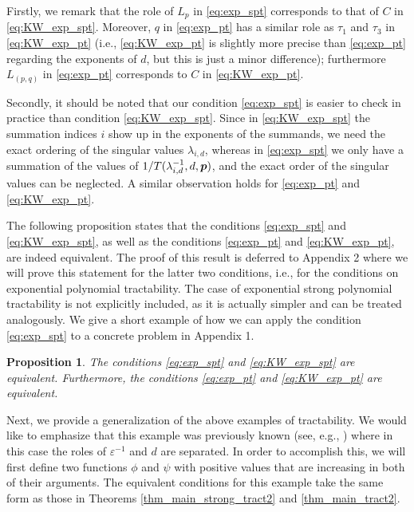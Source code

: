 \documentclass[sort&compress]{elsarticle}
\newcommand{\review}[1]{\begingroup\color{blue}#1\endgroup}
\newtheorem{proposition}{Proposition}
\begin{document}
Firstly, we remark that the role of $L_p$ in  \eqref{eq:exp_spt} corresponds to that of $C$ in \eqref{eq:KW_exp_spt}.
Moreover, $q$ in \eqref{eq:exp_pt} has a similar role as $\tau_1$ and $\tau_3$ in \eqref{eq:KW_exp_pt} (i.e., \eqref{eq:KW_exp_pt} is slightly more precise than \eqref{eq:exp_pt} regarding the exponents of $d$, but this is just a minor difference); furthermore $L_{(p,q)}$ in \eqref{eq:exp_pt} corresponds to $C$ in \eqref{eq:KW_exp_pt}.

Secondly, it should be noted that our condition \eqref{eq:exp_spt} is easier to check in practice than condition \eqref{eq:KW_exp_spt}. Since in \eqref{eq:KW_exp_spt} the summation indices $i$ show up in the exponents of the summands, we need the exact ordering of the singular values $\lambda_{i,d}$, whereas in \eqref{eq:exp_spt} we only have a summation of the values of $1/T(\lambda_{i,d}^{-1},d,\boldsymbol{p})$, and the exact order of the singular values can be neglected. A similar
observation holds for \eqref{eq:exp_pt} and \eqref{eq:KW_exp_pt}.

The following proposition states that the conditions \eqref{eq:exp_spt} and \eqref{eq:KW_exp_spt}, as well as the conditions \eqref{eq:exp_pt} and \eqref{eq:KW_exp_pt}, are indeed equivalent. 
The proof of this result is deferred to Appendix 2 where we will prove this statement for the latter two conditions, i.e., for the conditions on exponential polynomial tractability. The case of exponential strong polynomial tractability is not explicitly included, as it is actually simpler and can be treated analogously.  We give a short example of how we can apply the condition \eqref{eq:exp_spt} to a concrete problem in Appendix 1.

\begin{proposition}\label{prop:equiv_conditions}
The conditions \eqref{eq:exp_spt} and \eqref{eq:KW_exp_spt} are equivalent. Furthermore, the conditions \eqref{eq:exp_pt} and \eqref{eq:KW_exp_pt} are equivalent.
\end{proposition}

Next, we provide a generalization of the above examples of tractability. We would like to emphasize that this example was previously known (see, e.g., \cite{GW06}) where in this case the roles of $\varepsilon^{-1}$ and $d$ are separated. In order to accomplish this, we will first define two functions $\phi$ and $\psi$ with positive values that are increasing in both of their arguments. The equivalent conditions for this example take the same form as those in Theorems \ref{thm_main_strong_tract2} and \ref{thm_main_tract2}.
\end{document}
